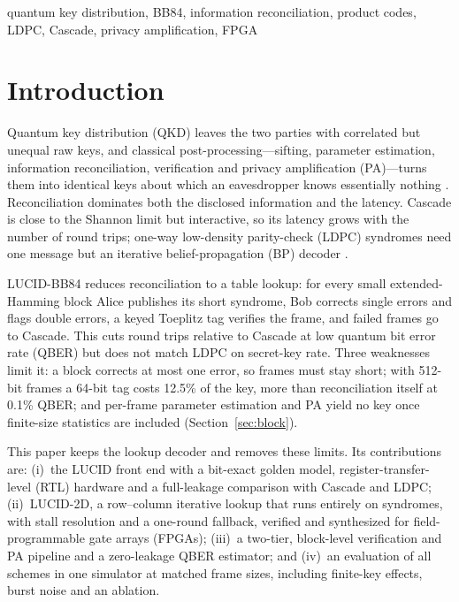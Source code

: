 \documentclass[conference]{IEEEtran}
\begin{document}
\begin{IEEEkeywords}
quantum key distribution, BB84, information reconciliation, product codes, LDPC, Cascade, privacy amplification, FPGA
\end{IEEEkeywords}

\section{Introduction}
Quantum key distribution (QKD) leaves the two parties with correlated but unequal raw keys, and classical post-processing---sifting, parameter estimation, information reconciliation, verification and privacy amplification (PA)---turns them into identical keys about which an eavesdropper knows essentially nothing \cite{bb84,scarani2009}. Reconciliation dominates both the disclosed information and the latency. Cascade \cite{cascade,demystifying} is close to the Shannon limit but interactive, so its latency grows with the number of round trips; one-way low-density parity-check (LDPC) syndromes \cite{gallager1962,elkouss2009,elkouss2011} need one message but an iterative belief-propagation (BP) decoder \cite{kschischang2001}.

LUCID-BB84 reduces reconciliation to a table lookup: for every small extended-Hamming block \cite{hamming1950} Alice publishes its short syndrome, Bob corrects single errors and flags double errors, a keyed Toeplitz tag verifies the frame, and failed frames go to Cascade. This cuts round trips relative to Cascade at low quantum bit error rate (QBER) but does not match LDPC on secret-key rate. Three weaknesses limit it: a block corrects at most one error, so frames must stay short; with 512-bit frames a 64-bit tag costs 12.5\% of the key, more than reconciliation itself at 0.1\% QBER; and per-frame parameter estimation and PA yield no key once finite-size statistics are included (Section~\ref{sec:block}).

This paper keeps the lookup decoder and removes these limits. Its contributions are: (i)~the LUCID front end with a bit-exact golden model, register-transfer-level (RTL) hardware and a full-leakage comparison with Cascade and LDPC; (ii)~LUCID-2D, a row--column iterative lookup that runs entirely on syndromes, with stall resolution and a one-round fallback, verified and synthesized for field-programmable gate arrays (FPGAs); (iii)~a two-tier, block-level verification and PA pipeline and a zero-leakage QBER estimator; and (iv)~an evaluation of all schemes in one simulator at matched frame sizes, including finite-key effects, burst noise and an ablation.
\end{document}
